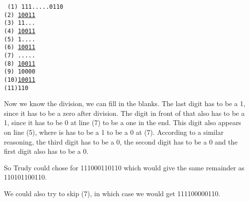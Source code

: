 \begin{enumerate}
\texttt{\noindent
(1) 111.....0110\\
(2) \underline{10011}\\
(3) \phantom{1}11...\\
(4) \phantom{1}\underline{10011}\\
(5) \phantom{11}1....\\
(6) \phantom{11}\underline{10011}\\
(7) \phantom{111}.....\\
(8) \phantom{111}\underline{10011}\\
(9) \phantom{111111}10000\\
(10)\phantom{111111}\underline{10011}\\
(11)\phantom{111111111}110\\
}

Now we know the division, we can fill in the blanks. The last digit has to be a 1, since it has to be a zero after division. The digit in front of that also has to be a 1, since it has to be 0 at line (7) to be a one in the end. This digit also appears on line (5), where is has to be a 1 to be a 0 at (7). According to a similar reasoning, the third digit has to be a 0, the second digit has to be a 0 and the first digit also has to be a 0.

So Trudy could chose for 111000110110 which would give the same remainder as 110101100110. 

We could also try to skip (7), in which case we would get 111100000110. 
\end{enumerate}